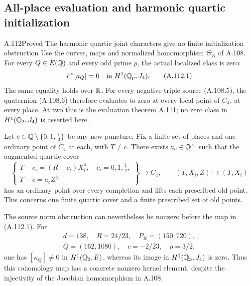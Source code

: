 \subsection{All-place evaluation and harmonic quartic initialization}

\begin{statement}{A.112}{Proved}
{The harmonic quartic joint characters give no finite initialization obstruction}
Use the curves, maps and normalized homomorphism
$\Theta_R$ of A.108.
For every $Q\in E(\mathbb Q)$ and every odd prime $p$,
the actual localized class is zero:
\[
       \bar r^{\,*}[\kappa_Q]=0
                       \quad\text{in }H^1(\mathbb Q_p,J_4).
\tag{A.112.1}
\]
The same equality holds over $\mathbb R$.
For every negative-triple source (A.108.5), the
quaternion (A.108.6) therefore evaluates to zero
at every local point of $C_4$, at every place.
At two this is the evaluation theorem A.111;
no zero class in $H^1(\mathbb Q_2,J_4)$ is asserted here.

Let $c\in\mathbb Q\setminus\{0,1,\tfrac12\}$ be any new
puncture. Fix a finite set of places and one
ordinary point of $C_4$ at each, with $T\ne c$.
There exists $a_c\in\mathbb Q^\times$ such that the
augmented quartic cover
\[
 \left\{
 \begin{array}{l}
 T-c_i=(R-c_i)X_i^4,\quad c_i=0,1,\tfrac12,\\
 T-c=a_c Z^4
 \end{array}
 \right\}
 \longrightarrow C_4,\qquad
             (T,X_i,Z)\longmapsto(T,X_i)
\tag{A.112.2}
\]
has an ordinary point over every completion and
lifts each prescribed old point.
This concerns one finite quartic cover and a
finite prescribed set of old points.

The source norm obstruction can nevertheless
be nonzero before the map in (A.112.1).
For
\[
 \begin{gathered}
 d=138,\quad R=24/23,\quad P_R=(150,720),\\
 Q=(162,1080),\quad c=-2/23,\quad \rho=3/2,
 \end{gathered}
\tag{A.112.3}
\]
one has $[\kappa_Q]\ne0$ in $H^1(\mathbb Q_3,E)$,
whereas its image in $H^1(\mathbb Q_3,J_4)$ is zero.
Thus this cohomology map has a concrete nonzero
kernel element, despite the injectivity of the
Jacobian homomorphism in A.108.
\end{statement}
